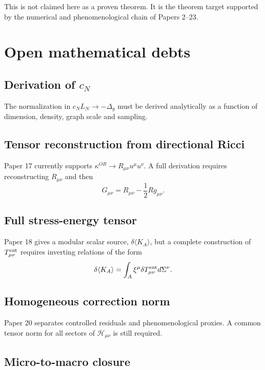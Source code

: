 \documentclass[11pt,a4paper]{article}
\begin{document}
This is not claimed here as a proven theorem. It is the theorem target
supported by the numerical and phenomenological chain of Papers 2--23.

\section{Open mathematical debts}

\subsection{Derivation of \(c_N\)}

The normalization in \(c_NL_N\to-\Delta_g\) must be derived analytically as a
function of dimension, density, graph scale and sampling.

\subsection{Tensor reconstruction from directional Ricci}

Paper 17 currently supports \(\kappa^{OR}\to R_{\mu\nu}u^\mu u^\nu\). A full
derivation requires reconstructing \(R_{\mu\nu}\) and then
\begin{equation}
  G_{\mu\nu}=R_{\mu\nu}-\frac12Rg_{\mu\nu}.
\end{equation}

\subsection{Full stress-energy tensor}

Paper 18 gives a modular scalar source, \(\delta\langle K_A\rangle\), but a
complete construction of \(T_{\mu\nu}^{\rm ent}\) requires inverting relations of
the form
\begin{equation}
  \delta\langle K_A\rangle
  =
  \int_A
  \xi^\mu
  \delta T_{\mu\nu}^{\rm ent}
  d\Sigma^\nu.
\end{equation}

\subsection{Homogeneous correction norm}

Paper 20 separates controlled residuals and phenomenological proxies. A common
tensor norm for all sectors of \(\mathcal H_{\mu\nu}\) is still required.

\subsection{Micro-to-macro closure}
\end{document}
